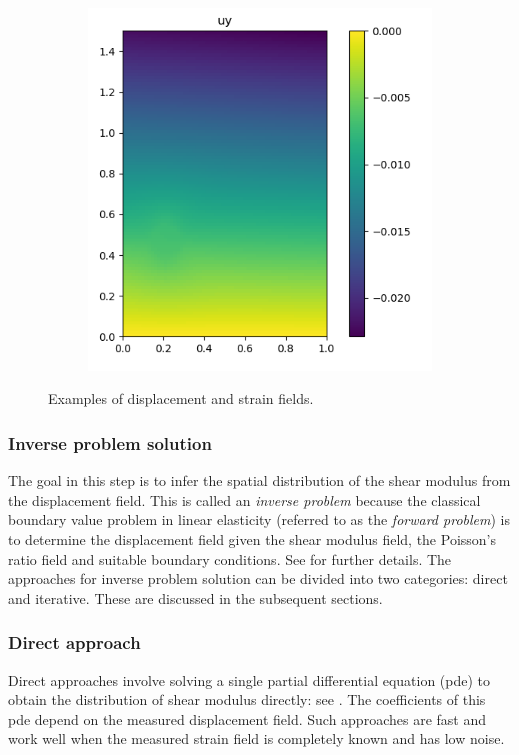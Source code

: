 \documentclass[12pt]{article}
\begin{document}
\begin{figure}[h]
\begin{subfigure}[b]{0.25\linewidth}
  \end{subfigure}
  \begin{subfigure}[b]{0.25\linewidth}
    \includegraphics[totalheight=4cm]{Figures/dispstrainfields/uy11_fypy.png}
  \end{subfigure}
  \caption{\label{fig:exampdispstrain} Examples of displacement and strain fields.}
\end{figure}
\subsubsection{Inverse problem solution} The goal in this step is to infer the spatial distribution of the shear modulus from the displacement field. This is called an \textit{inverse problem} because the classical boundary value problem in linear elasticity (referred to as the \textit{forward problem}) is to determine the displacement field given the shear modulus field, the Poisson's ratio field and suitable boundary conditions. See \cite{book:hugheslinear,book:fishbelytschko} for further details. The approaches for inverse problem solution can be divided into two categories: direct and iterative. These are discussed in the subsequent sections.
\subsubsection{Direct approach} Direct approaches involve solving a single partial differential equation (pde) to obtain the distribution of shear modulus directly: see \cite{paper:raghavan1994,paper:barboneadjwt,paper:albocher}. The coefficients of this pde depend on the measured displacement field. Such approaches are fast and work well when the measured strain field is completely known and has low noise.
\end{document}
